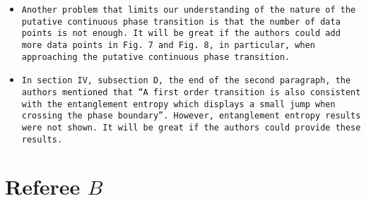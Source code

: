 \documentclass[aps,prb,superscriptaddress]{revtex4}
\begin{document}
\begin{itemize}
\item{\tt Another problem that limits our understanding of the nature of the
putative continuous phase transition is that the number of data points
is not enough. It will be great if the authors could add more data
points in Fig. 7 and Fig. 8, in particular, when approaching the
putative continuous phase transition.}

\item{\tt In section IV, subsection D, the end of the second paragraph, the
authors mentioned that “A first order transition is also consistent
with the entanglement entropy which displays a small jump when
crossing the phase boundary”. However, entanglement entropy results
were not shown. It will be great if the authors could provide these
results.}






\end{itemize}

\section*{Referee $B$}
\end{document}
